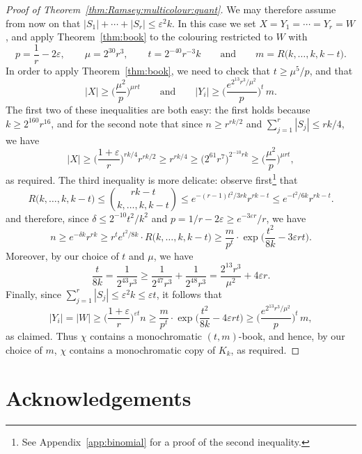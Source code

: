 \documentclass[12pt,reqno]{amsart}
\theoremstyle{definition}
\theoremstyle{remark}
\newcommand\eps{\varepsilon}
\renewcommand{\le}{\leqslant}
\renewcommand{\ge}{\geqslant}
\def\eps{\varepsilon}
\begin{document}
\begin{proof}[Proof of Theorem~\ref{thm:Ramsey:multicolour:quant}]
We may therefore assume from now on that  $|S_1| + \cdots + |S_r| \le \eps^2 k$. 
In this case we set $X = Y_1 = \cdots = Y_r = W$, and apply Theorem~\ref{thm:book} to the colouring restricted to $W$ with 
$$p = \frac{1}{r} - 2\eps, \qquad \mu = 2^{30} r^3, \qquad t = 2^{-40} r^{-3} k \qquad \text{and} \qquad m = R\big( k, \ldots, k, k - t \big).$$
In order to apply Theorem~\ref{thm:book}, we need to check that $t \ge \mu^5/p$, and that
$$|X| \ge \bigg( \frac{\mu^2}{p} \bigg)^{\mu r t} \qquad \text{and} \qquad |Y_i| \ge \bigg( \frac{e^{2^{13} r^3 / \mu^2}}{p} \bigg)^t \, m.$$
The first two of these inequalities are both easy: the first holds because $k \ge 2^{160} r^{16}$, and for the second note that since $n \ge r^{rk/2}$ and $\sum_{j = 1}^r |S_j| \le rk/4$, we have
$$|X| \ge \bigg( \frac{1+\eps}{r} \bigg)^{rk/4} r^{rk/2} \ge r^{rk/4} \ge \big( 2^{61} r^7 \big)^{2^{-10} r k} \ge \bigg( \frac{\mu^2}{p} \bigg)^{\mu r t},$$
as required. The third inequality is more delicate: observe first\footnote{See Appendix~\ref{app:binomial} for a proof of the second inequality.} that 
$$R\big( k, \ldots, k, k-t \big) \le \binom{rk-t}{k,\dots,k,k-t} \le e^{-(r-1)t^2/3rk} r^{rk-t} \le e^{-t^2/6k} r^{rk-t}.$$
and therefore, since $\delta \le 2^{-10} t^2/k^2$ and $p = 1/r - 2\eps \ge e^{-3\eps r} / r$, we have 
$$n \ge e^{-\delta k} r^{rk} \ge r^t e^{t^2/8k} \cdot R\big( k, \ldots, k, k-t \big) \ge \frac{m}{p^t} \cdot \exp\bigg( \frac{t^2}{8k} - 3\eps r t \bigg).$$
Moreover, by our choice of $t$ and $\mu$, we have 
$$\frac{t}{8k} = \frac{1}{2^{43} r^3} \ge \frac{1}{2^{47}r^3} + \frac{1}{2^{48}r^3} = \frac{2^{13} r^3}{\mu^2} + 4\eps r.$$
Finally, since $\sum_{j = 1}^r |S_j| \le \eps^2 k \le \eps t$, it follows that
$$|Y_i| = |W| \ge \bigg( \frac{1+\eps}{r} \bigg)^{\eps t} n \ge \frac{m}{p^t} \cdot \exp\bigg( \frac{t^2}{8k} - 4\eps r t \bigg) \ge \bigg( \frac{e^{2^{13} r^3 / \mu^2}}{p} \bigg)^t \, m,$$
as claimed. Thus $\chi$ contains a monochromatic $(t,m)$-book, and hence, by our choice of $m$, $\chi$ contains a monochromatic copy of $K_k$, as required.
\end{proof}

\section*{Acknowledgements}
\end{document}
